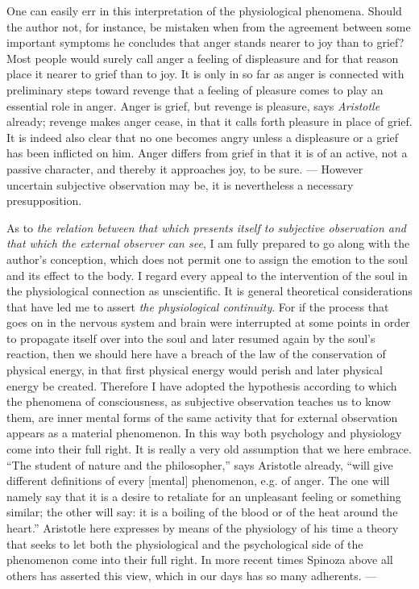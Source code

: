 \documentclass[12pt,a4paper,openany]{book}
\newcommand{\opage}[1]{\marginnote{\footnotesize\textit{[#1]}}}
\begin{document}
One can easily err in this interpretation of the
physiological phenomena. Should the author not, for instance, be mistaken
when from the agreement between some important
symptoms he concludes that anger stands nearer to joy than to
grief? Most people would surely call anger a feeling of displeasure
and for that reason place it nearer to grief than to joy.
It is only in so far as anger is connected with preliminary
steps toward revenge that a feeling of pleasure comes to play
an essential role in anger. Anger is grief, but revenge is
pleasure, says \emph{Aristotle} already; revenge makes anger
cease, in that it calls forth pleasure in place of grief. It is
indeed also clear that no one becomes angry unless a
displeasure or a grief has been inflicted on him. Anger differs from grief in that
it is of an active, not a passive character, and thereby it approaches
joy, to be sure. --- However uncertain subjective
observation may be, it is nevertheless a necessary
presupposition.

As to \emph{the relation between that which presents itself
to subjective observation and that which the external observer can
see}, I am fully prepared to go along with the author's
conception, which does not permit one to assign the emotion
to the soul and its effect to the body. I regard
every appeal to the intervention of the soul in the physiological
connection as unscientific. It is general theoretical
considerations that have led me to assert \emph{the physiological
continuity}. For if the process that goes on in
the nervous system and brain were interrupted at some points in order to
propagate itself over into the soul and later resumed again by
the soul's reaction, then we should here have a breach of the law
of the conservation of physical energy, in that first
physical energy would perish and later physical energy be created.
Therefore I have adopted the hypothesis according to which
the phenomena of consciousness, as subjective observation
teaches us to know them, are inner mental forms of the
same activity that for external observation appears
as a material phenomenon. In this way both
\opage{57}psychology and physiology come into their full right. It is
really a very old assumption that we here embrace.
``The student of nature and the philosopher,'' says Aristotle already, ``will give
different definitions of every [mental] phenomenon, e.g.
of anger. The one will namely say that it is a desire
to retaliate for an unpleasant feeling or something similar;
the other will say: it is a boiling of the blood or of the
heat around the heart.'' Aristotle here expresses by
means of the physiology of his time a theory that seeks to let both
the physiological and the psychological side of the phenomenon
come into their full right. In more recent times Spinoza above all others
has asserted this view, which in our days has so
many adherents. ---
\end{document}
